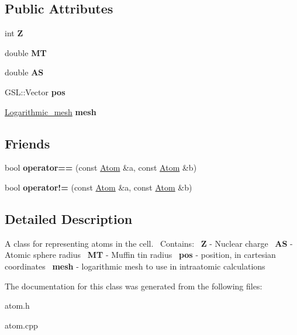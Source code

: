 \subsection*{Public Attributes}
\begin{DoxyCompactItemize}
\item 
\mbox{\label{classAtom_a5596bb9320edcecfaa8df97f5d1880fd}} 
int {\bfseries Z}
\item 
\mbox{\label{classAtom_a7940182ab4aa43283df6020a0f0dd67d}} 
double {\bfseries MT}
\item 
\mbox{\label{classAtom_aea60fa7809c63ccc399467fe8f737e46}} 
double {\bfseries AS}
\item 
\mbox{\label{classAtom_ac1c5c0961f23ba8bd1d06f21223b7c87}} 
G\+S\+L\+::\+Vector {\bfseries pos}
\item 
\mbox{\label{classAtom_a91d103a87fcfdc4a6edb8ce01b249a7c}} 
\hyperlink{classLogarithmic__mesh}{Logarithmic\+\_\+mesh} {\bfseries mesh}
\end{DoxyCompactItemize}
\subsection*{Friends}
\begin{DoxyCompactItemize}
\item 
\mbox{\label{classAtom_a5e07c0c118320fdc1f667405d874d4d4}} 
bool {\bfseries operator==} (const \hyperlink{classAtom}{Atom} \&a, const \hyperlink{classAtom}{Atom} \&b)
\item 
\mbox{\label{classAtom_a5c6fb2b0ae8e500e98c63ca22091c4a0}} 
bool {\bfseries operator!=} (const \hyperlink{classAtom}{Atom} \&a, const \hyperlink{classAtom}{Atom} \&b)
\end{DoxyCompactItemize}


\subsection{Detailed Description}
A class for representing atoms in the cell.~\newline
Contains\+:~\newline
{\bfseries Z} -\/ Nuclear charge~\newline
{\bfseries AS} -\/ Atomic sphere radius~\newline
{\bfseries MT} -\/ Muffin tin radius~\newline
{\bfseries pos} -\/ position, in cartesian coordinates~\newline
{\bfseries mesh} -\/ logarithmic mesh to use in intraatomic calculations~\newline


The documentation for this class was generated from the following files\+:\begin{DoxyCompactItemize}
\item 
atom.\+h\item 
atom.\+cpp\end{DoxyCompactItemize}
